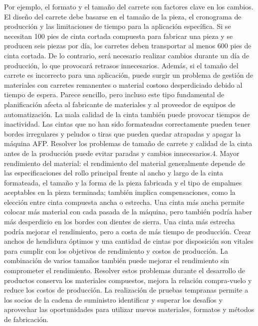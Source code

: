 Por ejemplo, el formato y el tamaño del carrete son factores clave en los cambios. El diseño del carrete debe basarse en el tamaño de la pieza, el cronograma de producción y las limitaciones de tiempo para la aplicación específica. Si se necesitan 100 pies de cinta cortada compuesta para fabricar una pieza y se producen seis piezas por día, los carretes deben transportar al menos 600 pies de cinta cortada. De lo contrario, será necesario realizar cambios durante un día de producción, lo que provocará retrasos innecesarios. Además, si el tamaño del carrete es incorrecto para una aplicación, puede surgir un problema de gestión de materiales con carretes remanentes o material costoso desperdiciado debido al tiempo de espera. Parece sencillo, pero incluso este tipo fundamental de planificación afecta al fabricante de materiales y al proveedor de equipos de automatización.
La mala calidad de la cinta también puede provocar tiempos de inactividad. Las cintas que no han sido formateadas correctamente pueden tener bordes irregulares y peludos o tiras que pueden quedar atrapadas y apagar la máquina AFP. Resolver los problemas de tamaño de carrete y calidad de la cinta antes de la producción puede evitar paradas y cambios innecesarios.4. Mayor rendimiento del material: el rendimiento del material generalmente depende de las especificaciones del rollo principal frente al ancho y largo de la cinta formateada, el tamaño y la forma de la pieza fabricada y el tipo de empalmes aceptables en la pieza terminada; también implica compensaciones, como la elección entre cinta compuesta ancha o estrecha.
 Una cinta más ancha permite colocar más material con cada pasada de la máquina, pero también podría haber más desperdicio en los bordes con dientes de sierra. Una cinta más estrecha podría mejorar el rendimiento, pero a costa de más tiempo de producción. Crear anchos de hendidura óptimos y una cantidad de cintas por disposición son vitales para cumplir con los objetivos de rendimiento y costos de producción. La combinación de varios tamaños también puede mejorar el rendimiento sin comprometer el rendimiento.
Resolver estos problemas durante el desarrollo de productos conserva los materiales compuestos, mejora la relación compra-vuelo y reduce los costos de producción. La realización de pruebas tempranas permite a los socios de la cadena de suministro identificar y superar los desafíos y aprovechar las oportunidades para utilizar nuevos materiales, formatos y métodos de fabricación.
